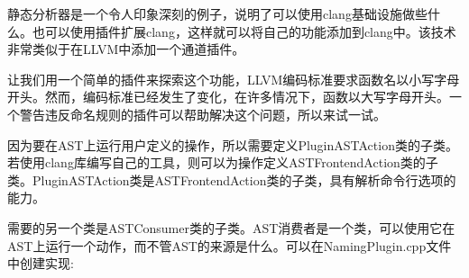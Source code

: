 
静态分析器是一个令人印象深刻的例子，说明了可以使用clang基础设施做些什么。也可以使用插件扩展clang，这样就可以将自己的功能添加到clang中。该技术非常类似于在LLVM中添加一个通道插件。

让我们用一个简单的插件来探索这个功能，LLVM编码标准要求函数名以小写字母开头。然而，编码标准已经发生了变化，在许多情况下，函数以大写字母开头。一个警告违反命名规则的插件可以帮助解决这个问题，所以来试一试。

因为要在AST上运行用户定义的操作，所以需要定义PluginASTAction类的子类。若使用clang库编写自己的工具，则可以为操作定义ASTFrontendAction类的子类。PluginASTAction类是ASTFrontendAction类的子类，具有解析命令行选项的能力。

需要的另一个类是ASTConsumer类的子类。AST消费者是一个类，可以使用它在AST上运行一个动作，而不管AST的来源是什么。可以在NamingPlugin.cpp文件中创建实现:

